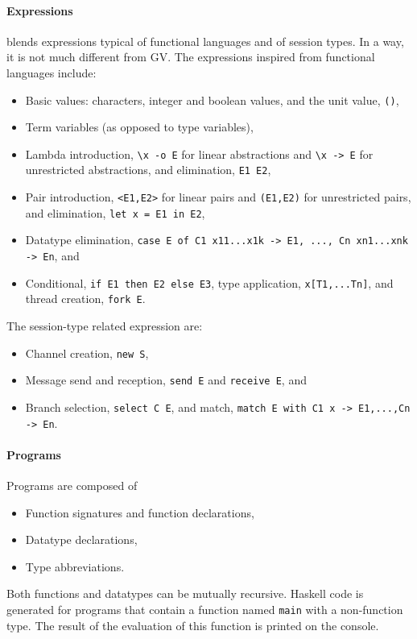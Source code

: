 \paragraph{Expressions}

\freest{} blends expressions typical of functional languages and of
session types. In a way, it is not much different from GV.
%
The expressions inspired from functional languages include:
%
\begin{itemize}
\item Basic values: characters, integer and boolean values, and the
  unit value, \lstinline|()|,
\item Term variables (as opposed to type variables),
\item Lambda introduction, \lstinline|\x -o E| for linear abstractions
  and \lstinline|\x -> E| for unrestricted abstractions, and
  elimination, \lstinline|E1 E2|,
\item Pair introduction, \lstinline|<E1,E2>| for linear pairs and
  \lstinline|(E1,E2)| for unrestricted pairs, and elimination,
  \lstinline|let x = E1 in E2|,
\item Datatype elimination,
  \lstinline|case E of C1 x11...x1k -> E1, ..., Cn xn1...xnk -> En|, and
\item Conditional, \lstinline|if E1 then E2 else E3|, type
  application, \lstinline|x[T1,...Tn]|, and thread creation,
  \lstinline|fork E|.
\end{itemize}

The session-type related expression are:
%
\begin{itemize}
\item Channel creation, \lstinline|new S|,
\item Message send and reception, \lstinline|send E| and
  \lstinline|receive E|, and
\item Branch selection, \lstinline|select C E|, and match,
  \lstinline|match E with C1 x -> E1,...,Cn -> En|.
\end{itemize}

\paragraph{Programs}

Programs are composed of
%
\begin{itemize}
\item Function signatures and function declarations, 
\item Datatype declarations,
\item Type abbreviations.
\end{itemize}

Both functions and datatypes can be mutually recursive. Haskell code
is generated for programs that contain a function named
\lstinline|main| with a non-function type. The result of the
evaluation of this function is printed on the console.

